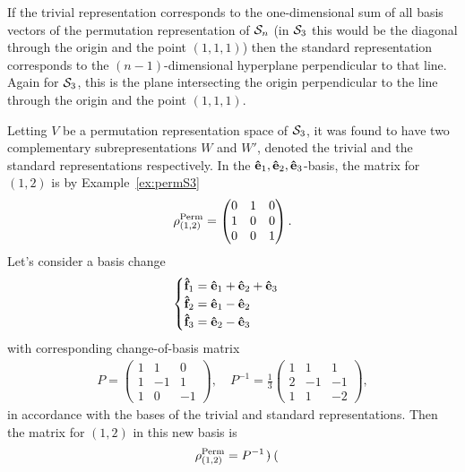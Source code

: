 If the trivial representation corresponds to the one-dimensional sum of all basis vectors of the permutation representation of $\mathcal{S}_n$ (in $\mathcal{S}_3$ this would be the diagonal through the origin and the point $(1,1,1)$) then the standard representation corresponds to the $(n-1)$-dimensional hyperplane perpendicular to that line. Again for $\mathcal{S}_3$, this is the plane intersecting the origin perpendicular to the line through the origin and the point $(1,1,1)$.

\begin{example}
		Letting $V$ be a permutation representation space of $\mathcal{S}_3$, it was found to have two complementary subrepresentations $W$ and $W'$, denoted the trivial and the standard representations respectively. In the $\mathbf{\hat{e}}_1, \mathbf{\hat{e}}_2, \mathbf{\hat{e}}_3$-basis, the matrix for $(1,2)$ is by Example~\ref{ex:permS3}
		\begin{align*}
			\rho^{\text{Perm}}_{(1,2)} = \begin{pmatrix}
				0&1&0 \\ 1&0&0 \\ 0&0&1
			\end{pmatrix}.
		\end{align*}
		Let's consider a basis change 
		\begin{align*}
			\begin{cases}
				\mathbf{\hat{f}}_1 = \mathbf{\hat{e}}_1 + \mathbf{\hat{e}}_2 + \mathbf{\hat{e}}_3 \\
				\mathbf{\hat{f}}_2 = \mathbf{\hat{e}}_1 - \mathbf{\hat{e}}_2 \\
				\mathbf{\hat{f}}_3 = \mathbf{\hat{e}}_2 - \mathbf{\hat{e}}_3
			\end{cases}
		\end{align*}
		with corresponding change-of-basis matrix
		\begin{align*}
			P = \begin{pmatrix}
				1&1&0 \\ 1&-1&1 \\ 1&0&-1
			\end{pmatrix}, \quad P^{-1} =  \frac{1}{3}\begin{pmatrix}
			1&1&1\\2&-1&-1\\1&1&-2
			\end{pmatrix},
		\end{align*}
		in accordance with the bases of the trivial and standard representations. Then the matrix for $(1,2)$ in this new basis is
		\begin{align*}
			\rho^{\text{Perm}}_{(1,2)} = 
			 P^{-1} \cdot \begin{pmatrix}

\end{pmatrix}
\end{align*}
\end{example}

